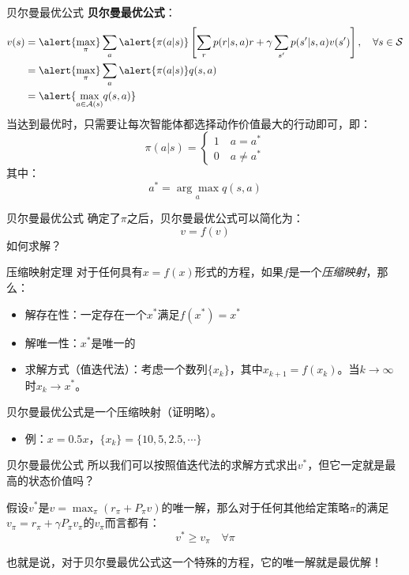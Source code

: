 \begin{frame}{贝尔曼最优公式}
    \textbf{贝尔曼最优公式}：
    \[
        \begin{aligned}
            v(s)&=\alert{\underset{\pi}{\max}}\sum_a\alert{\pi(a|s)}\left[\sum_r p(r|s,a)r+\gamma\sum_{s'}p(s'|s,a)v(s')\right], \quad \forall s\in\mathcal{S} \\
            &=\alert{\underset{\pi}{\max}}\sum_a\alert{\pi(a|s)}q(s,a) \\
            &=\alert{\underset{a\in\mathcal{A}(s)}{\max}q(s,a)}
        \end{aligned}
    \]
    当达到最优时，只需要让每次智能体都选择动作价值最大的行动即可，即：
    \[
        \pi(a|s)=
        \begin{cases}
            1 \quad a=a^* \\
            0 \quad a\neq a^*
        \end{cases}
    \]
    其中：
    \[
        a^*=\underset{a}{\arg\max} q(s,a)
    \]
\end{frame}

\begin{frame}{贝尔曼最优公式}
    确定了$\pi$之后，贝尔曼最优公式可以简化为：
    \[
        v=f(v)
    \]
    如何求解？
    \begin{block}{压缩映射定理}
        对于任何具有$x=f(x)$形式的方程，如果$f$是一个\textit{压缩映射}，那么：
        \begin{itemize}
            \item 解存在性：一定存在一个$x^*$满足$f(x^*)=x^*$
            \item 解唯一性：$x^*$是唯一的
            \item 求解方式（值迭代法）：考虑一个数列$\{x_k\}$，其中$x_{k+1}=f(x_k)$。当$k\rightarrow\infty$时$x_k\rightarrow x^*$。
        \end{itemize}
    \end{block}
    贝尔曼最优公式是一个压缩映射（证明略）。
    \begin{itemize}
        \item 例：$x=0.5x$，$\{x_k\}=\{10, 5, 2.5,\cdots\}$
    \end{itemize}
\end{frame}

\begin{frame}{贝尔曼最优公式}
    所以我们可以按照值迭代法的求解方式求出$v^*$，但它一定就是最高的状态价值吗？
    \begin{theorem}
        假设$v^*$是$v=\max_\pi(r_\pi+P_\pi v)$的唯一解，那么对于任何其他给定策略$\pi$的满足$v_\pi=r_\pi+\gamma P_\pi v_\pi$的$v_\pi$而言都有：
        \[
            v^*\geq v_\pi \quad \forall \pi
        \]
    \end{theorem}
    也就是说，对于贝尔曼最优公式这一个特殊的方程，\alert{它的唯一解就是最优解！}
\end{frame}

